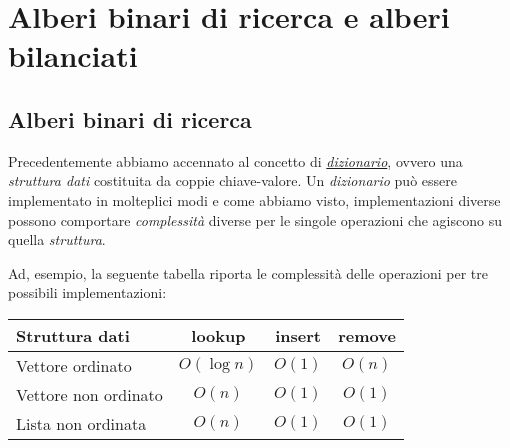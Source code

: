 \chapter{Alberi binari di ricerca e alberi bilanciati}
\section{Alberi binari di ricerca}
Precedentemente abbiamo accennato al concetto di \hyperref[def:39]
{\emph{dizionario}}, ovvero una \emph{struttura dati} costituita da coppie
chiave-valore. Un \emph{dizionario} può essere implementato in molteplici modi e
come abbiamo visto, implementazioni diverse possono comportare \emph{complessità}
diverse per le singole operazioni che agiscono su quella \emph{struttura}.

Ad, esempio, la seguente tabella riporta le complessità delle operazioni per
tre possibili implementazioni:
\begin{table}[h]
    \renewcommand{\arraystretch}{1.2}
    \centering
    \begin{tabular}{|l|c|c|c|}
        \hline
        \textbf{Struttura dati} & \textbf{lookup} & \textbf{insert} & \textbf{remove}\\
        \hline
        Vettore ordinato & $O(\log n)$ & $O(1)$ & $O(n)$\\
        \hline
        Vettore non ordinato & $O(n)$ & $O(1)$ & $O(1)$\\
        \hline
        Lista non ordinata & $O(n)$ & $O(1)$ & $O(1)$\\
        \hline
    \end{tabular}
\end{table}

